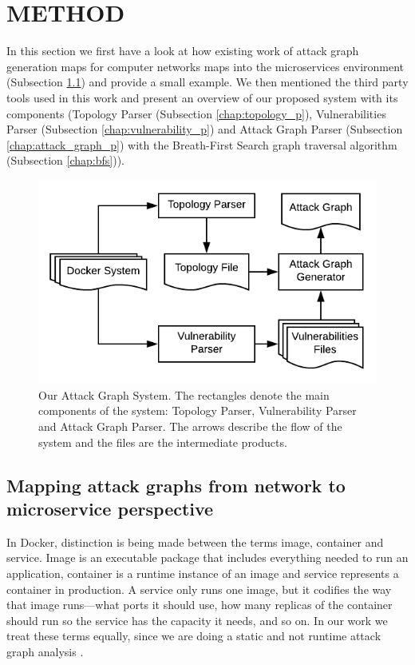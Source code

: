 \section{METHOD}
In this section we first have a look at how existing work of attack graph generation maps for computer networks maps into the microservices environment (Subsection \ref{chap:mapping}) and provide a small example. We then mentioned the third party tools used in this work and present an overview of our proposed system with its components (Topology Parser (Subsection \ref{chap:topology_p}), Vulnerabilities Parser (Subsection \ref{chap:vulnerability_p}) and Attack Graph Parser (Subsection \ref{chap:attack_graph_p}) with the Breath-First Search graph traversal algorithm (Subsection \ref{chap:bfs})). 


\begin{figure}
	\includegraphics[width=\textwidth]{./images/AttackGraphSystem}
	\caption{Our Attack Graph System. The rectangles denote the main components of the system: Topology Parser, Vulnerability Parser and Attack Graph Parser. The arrows describe the flow of the system and the files are the intermediate products.}
	\label{AttackGraphSystem}
\end{figure}

\subsection{Mapping attack graphs from network to microservice perspective}
\label{chap:mapping}
In Docker, distinction is being made between the terms image, container and service. Image is an executable package that includes everything needed to run an application, container is a runtime instance of an image and service represents a container in production. A service only runs one image, but it codifies the way that image runs—what ports it should use, how many replicas of the container should run so the service has the capacity it needs, and so on. In our work we treat these terms equally, since we are doing a static and not runtime attack graph analysis \cite{merkel2014docker}.

